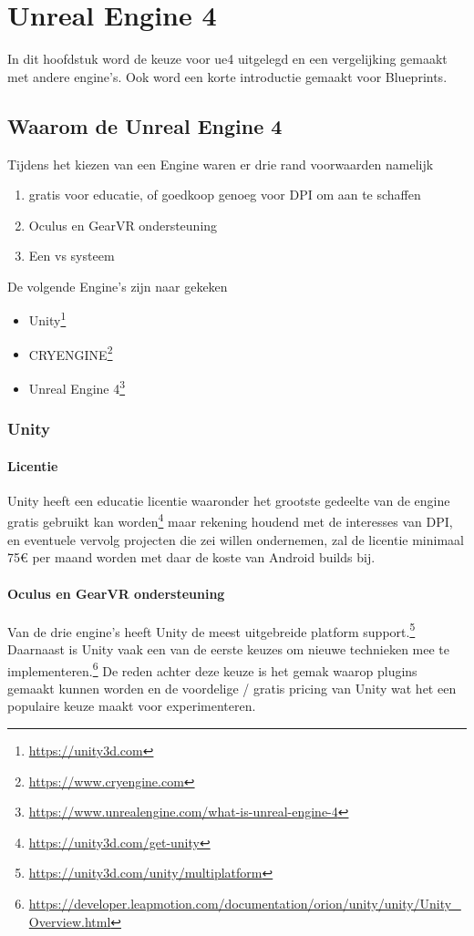\chapter{Unreal Engine 4}

In dit hoofdstuk word de keuze voor \gls{ue4} uitgelegd en een vergelijking gemaakt met andere engine's.
Ook word een korte introductie gemaakt voor Blueprints.

\section{Waarom de Unreal Engine 4}

Tijdens het kiezen van een Engine waren er drie rand voorwaarden namelijk 
\begin{enumerate}
	\item gratis voor educatie, of goedkoop genoeg voor DPI om aan te schaffen
	\item Oculus en GearVR ondersteuning
	\item Een \gls{vs} systeem
\end{enumerate}

De volgende Engine’s zijn naar gekeken 
\begin{itemize}
\item Unity\footnote{\url{https://unity3d.com}}
\item CRYENGINE\footnote{\url{https://www.cryengine.com}}
\item Unreal Engine 4\footnote{\url{https://www.unrealengine.com/what-is-unreal-engine-4}}
\end{itemize}

\subsection{Unity}

\subsubsection{Licentie}
Unity heeft een educatie licentie waaronder het grootste gedeelte van de engine gratis gebruikt kan worden\footnote{\url{https://unity3d.com/get-unity}} maar rekening houdend met de interesses van DPI, en eventuele vervolg projecten die zei willen ondernemen, zal de licentie minimaal 75€ per maand worden met daar de koste van Android builds bij.

\subsubsection{Oculus en GearVR ondersteuning}
Van de drie engine’s heeft Unity de meest uitgebreide platform support.\footnote{\url{https://unity3d.com/unity/multiplatform}} Daarnaast is Unity vaak een van de eerste keuzes om nieuwe technieken mee te implementeren.\footnote{\url{https://developer.leapmotion.com/documentation/orion/unity/unity/Unity_Overview.html}} De reden achter deze keuze is het gemak waarop plugins gemaakt kunnen worden en de voordelige / gratis pricing van Unity wat het een populaire keuze maakt voor experimenteren.

